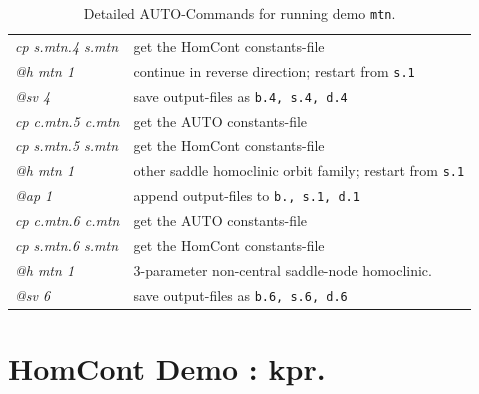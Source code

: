 \documentclass[12pt]{report}
\begin{document}
\begin{table}[htbp]
\begin{center}
\begin{tabular}{| l | l |}
  {\it cp s.mtn.4 s.mtn} & get the HomCont constants-file \\ 
  {\it @h mtn 1} & continue in reverse direction; restart from {\tt s.1} \\ 
  {\it @sv 4} & save output-files as {\tt b.4, s.4, d.4} \\ 
\hline
  {\it cp c.mtn.5 c.mtn} & get the AUTO constants-file \\ 
  {\it cp s.mtn.5 s.mtn} & get the HomCont constants-file \\
  {\it @h mtn 1} & other saddle homoclinic orbit family; restart from {\tt s.1} \\
  {\it @ap 1} & append output-files to {\tt b., s.1, d.1} \\ 
\hline
  {\it cp c.mtn.6 c.mtn} & get the AUTO constants-file \\ 
  {\it cp s.mtn.6 s.mtn} & get the HomCont constants-file \\ 
  {\it @h mtn 1} & 3-parameter non-central saddle-node homoclinic. \\ 
  {\it @sv 6} & save output-files as {\tt b.6, s.6, d.6} \\ 
\hline
\end{tabular}
\caption{Detailed {\cal AUTO}-Commands for running demo {\tt mtn}.}
\label{tbl:demo_mtn_1}
\end{center}
\end{table}



\chapter{ {\cal HomCont} Demo : kpr.} \label{ch:HomCont_kpr}

\end{document}
